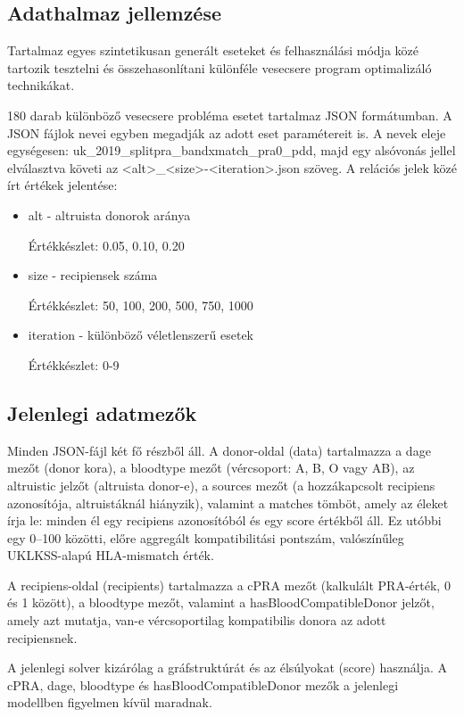\documentclass[12pt,a4paper]{article}
\begin{document}
\subsection{Adathalmaz jellemzése}

Tartalmaz egyes szintetikusan generált eseteket és felhasználási módja közé tartozik tesztelni és összehasonlítani különféle vesecsere program optimalizáló technikákat.

180 darab különböző vesecsere probléma esetet tartalmaz JSON formátumban. A JSON fájlok nevei egyben megadják az adott eset paramétereit is.
A nevek eleje egységesen:
uk\_2019\_splitpra\_bandxmatch\_pra0\_pdd,
majd egy alsóvonás jellel elválasztva követi az
<alt>\_<size>-<iteration>.json szöveg.
A relációs jelek közé írt értékek jelentése:
\begin{itemize}
	\item alt - altruista donorok aránya
	
	Értékkészlet: 0.05, 0.10, 0.20

	\item size - recipiensek száma
	
	Értékkészlet: 50, 100, 200, 500, 750, 1000

	\item iteration - különböző véletlenszerű esetek
	
	Értékkészlet: 0-9
\end{itemize}

\subsection{Jelenlegi adatmezők}

Minden JSON-fájl két fő részből áll. A donor-oldal (data) tartalmazza a dage mezőt (donor kora), a bloodtype mezőt (vércsoport: A, B, O vagy AB), az altruistic jelzőt (altruista donor-e), a sources mezőt (a hozzákapcsolt recipiens azonosítója, altruistáknál hiányzik), valamint a matches tömböt, amely az éleket írja le: minden él egy recipiens azonosítóból és egy score értékből áll. Ez utóbbi egy 0--100 közötti, előre aggregált kompatibilitási pontszám, valószínűleg UKLKSS-alapú HLA-mismatch érték.

A recipiens-oldal (recipients) tartalmazza a cPRA mezőt (kalkulált PRA-érték, 0 és 1 között), a bloodtype mezőt, valamint a hasBloodCompatibleDonor jelzőt, amely azt mutatja, van-e vércsoportilag kompatibilis donora az adott recipiensnek.

A jelenlegi solver kizárólag a gráfstruktúrát és az élsúlyokat (score) használja. A cPRA, dage, bloodtype és hasBloodCompatibleDonor mezők a jelenlegi modellben figyelmen kívül maradnak.
\end{document}
